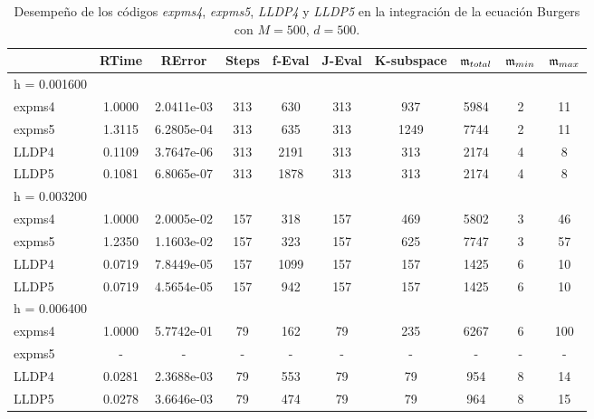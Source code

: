 \begin{table}[htb]
	\caption{Desempeño de los códigos \emph{expms4}, \emph{expms5}, \emph{LLDP4} y \emph{LLDP5} en la integración de la ecuación Burgers con $M=500$, $d=500$.}
	\centering
	\begin{tabular}{lccccccccc}
		\hline
		& RTime & RError & Steps & f-Eval & J-Eval & K-subspace & $\mathfrak{m}_{total}$ & $\mathfrak{m}_{min}$ & $\mathfrak{m}_{max}$ \\
		\hline
		h = 0.001600 &  &  &  &  &  &  &  &  &  \\
		expms4 & 1.0000 & 2.0411e-03 & 313 & 630 & 313 & 937 & 5984 & 2 & 11  \\
		expms5 & 1.3115 & 6.2805e-04 & 313 & 635 & 313 & 1249 & 7744 & 2 & 11  \\
		LLDP4 & 0.1109 & 3.7647e-06 & 313 & 2191 & 313 & 313 & 2174 & 4 & 8  \\
		LLDP5 & 0.1081 & 6.8065e-07 & 313 & 1878 & 313 & 313 & 2174 & 4 & 8  \\
		\hline
		h = 0.003200 &  &  &  &  &  &  &  &  &  \\
		expms4 & 1.0000 & 2.0005e-02 & 157 & 318 & 157 & 469 & 5802 & 3 & 46  \\
		expms5 & 1.2350 & 1.1603e-02 & 157 & 323 & 157 & 625 & 7747 & 3 & 57  \\
		LLDP4 & 0.0719 & 7.8449e-05 & 157 & 1099 & 157 & 157 & 1425 & 6 & 10  \\
		LLDP5 & 0.0719 & 4.5654e-05 & 157 & 942 & 157 & 157 & 1425 & 6 & 10  \\
		\hline
		h = 0.006400 &  &  &  &  &  &  &  &  &  \\
		expms4 & 1.0000 & 5.7742e-01 & 79 & 162 & 79 & 235 & 6267 & 6 & 100  \\
		expms5 & - & - & - & - & - & - &- & - & -\\
		LLDP4 & 0.0281 & 2.3688e-03 & 79 & 553 & 79 & 79 & 954 & 8 & 14  \\
		LLDP5 & 0.0278 & 3.6646e-03 & 79 & 474 & 79 & 79 & 964 & 8 & 15  \\
		\hline
	\end{tabular}
	\label{tab:num-exp-lldp-fix-step:bgna}
\end{table}


